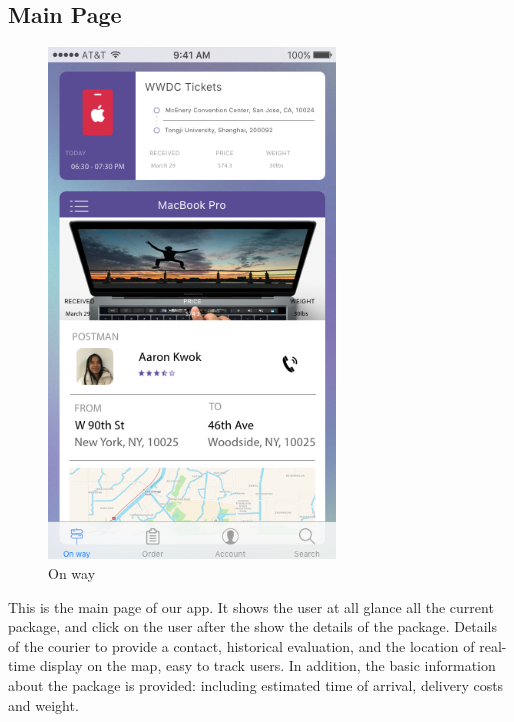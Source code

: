 \documentclass[12pt]{scrreprt}
\begin{document}
\subsection{Main Page}
\begin{figure}[htbp]
  \centering\includegraphics[width=3in]{DocumentRes/OnWay.png}
  \caption{On way}
\end{figure}
This is the main page of our app. It shows the user at all glance all the current package, and click on the user after the show the details of the package. Details of the courier to provide a contact, historical evaluation, and the location of real-time display on the map, easy to track users. In addition, the basic information about the package is provided: including estimated time of arrival, delivery costs and weight.
\end{document}
